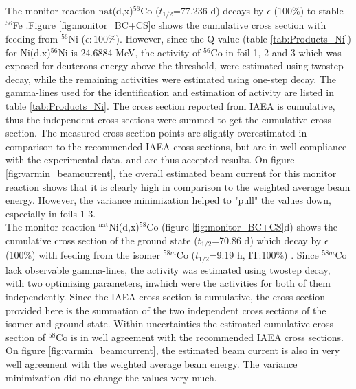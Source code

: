 \noindent 
The monitor reaction $\text{nat}$(d,x)$^{56}$Co ($t_{1/2}$=77.236 d) decays by $\epsilon$ (100\%) to stable $^{56}$Fe \cite{Junde2011}.Figure \ref{fig:monitor_BC+CS}c shows the cumulative cross section with feeding from $^{56}$Ni ($\epsilon:100\%$). However, since the Q-value (table \ref{tab:Products_Ni}) for Ni(d,x)$^{56}$Ni is 24.6884 MeV, the activity of $^{56}$Co in foil 1, 2 and 3 which was exposed for deuterons energy above the threshold, were estimated using twostep decay, while the remaining activities were estimated using one-step decay. The gamma-lines used for the identification and estimation of activity are listed in table \ref{tab:Products_Ni}. The cross section reported from IAEA is cumulative, thus the independent cross sections were summed to get the cumulative cross section. The measured cross section points are slightly overestimated in comparison to the recommended IAEA cross sections, but are in well compliance with the experimental data, and are thus accepted results. On figure \ref{fig:varmin_beamcurrent}, the overall estimated beam current for this monitor reaction shows that it is clearly high in comparison to the weighted average beam energy. However, the variance minimization helped to "pull" the values down, especially in foils 1-3. \\

\noindent 
The monitor reaction $^\text{nat}$Ni(d,x)$^{58}$Co (figure \ref{fig:monitor_BC+CS}d) shows the cumulative cross section of the ground state ($t_{1/2}$=70.86 d) which decay by $\epsilon$ (100\%) with feeding from the isomer $^{58m}$Co ($t_{1/2}$=9.19 h, IT:100\%) \cite{Nesaraja2010}. Since $^{58m}$Co lack observable gamma-lines, the activity was estimated using twostep decay, with two optimizing parameters, inwhich were the activities for both of them independently. Since the IAEA cross section is cumulative, the cross section provided here is the summation of the two independent cross sections of the isomer and ground state. Within uncertainties the estimated cumulative cross section of $^{58}$Co is in well agreement with the recommended IAEA cross sections. On figure \ref{fig:varmin_beamcurrent}, the estimated beam current is also in very well agreement with the weighted average beam energy. The variance minimization did no change the values very much.    \\

